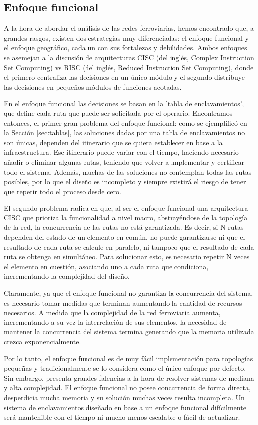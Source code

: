 \subsection{Enfoque funcional}

    A la hora de abordar el análisis de las redes ferroviarias, hemos encontrado que, a grandes rasgos, existen dos estrategias muy diferenciadas: el enfoque funcional y el enfoque geográfico, cada un con sus fortalezas y debilidades. Ambos enfoques se asemejan a la discusión de arquitecturas CISC (del inglés, Complex Instruction Set Computing) vs RISC (del inglés, Reduced Instruction Set Computing), donde el primero centraliza las decisiones en un único módulo y el segundo distribuye las decisiones en pequeños módulos de funciones acotadas.    

    En el enfoque funcional las decisiones se basan en la 'tabla de enclavamientos', que define cada ruta que puede ser solicitada por el operario. Encontramos entonces, el primer gran problema del enfoque funcional: como se ejemplificó en la Sección \ref{sec:tablas}, las soluciones dadas por una tabla de enclavamientos no son únicas, dependen del itinerario que se quiera establecer en base a la infraestructura. Ese itinerario puede variar con el tiempo, haciendo necesario añadir o eliminar algunas rutas, teniendo que volver a implementar y certificar todo el sistema. Además, muchas de las soluciones no contemplan todas las rutas posibles, por lo que el diseño es incompleto y siempre existirá el riesgo de tener que repetir todo el proceso desde cero.

    El segundo problema radica en que, al ser el enfoque funcional una arquitectura CISC que prioriza la funcionalidad a nivel macro, abstrayéndose de la topología de la red, la concurrencia de las rutas no está garantizada. Es decir, si N rutas dependen del estado de un elemento en común, no puede garantizarse ni que el resultado de cada ruta se calcule en paralelo, ni tampoco que el resultado de cada ruta se obtenga en simultáneo. Para solucionar esto, es necesario repetir N veces el elemento en cuestión, asociando uno a cada ruta que condiciona, incrementando la complejidad del diseño. 
    
    Claramente, ya que el enfoque funcional no garantiza la concurrencia del sistema, es necesario tomar medidas que terminan aumentando la cantidad de recursos necesarios. A medida que la complejidad de la red ferroviaria aumenta, incrementando a su vez la interrelación de sus elementos, la necesidad de mantener la concurrencia del sistema termina generando que la memoria utilizada crezca exponencialmente.

    Por lo tanto, el enfoque funcional es de muy fácil implementación para topologías pequeñas y tradicionalmente se lo considera como el único enfoque por defecto. Sin embargo, presenta grandes falencias a la hora de resolver sistemas de mediana y alta complejidad. El enfoque funcional no posee concurrencia de forma directa, desperdicia mucha memoria y su solución muchas veces resulta incompleta. Un sistema de enclavamientos diseñado en base a un enfoque funcional difícilmente será mantenible con el tiempo ni mucho menos escalable o fácil de actualizar.